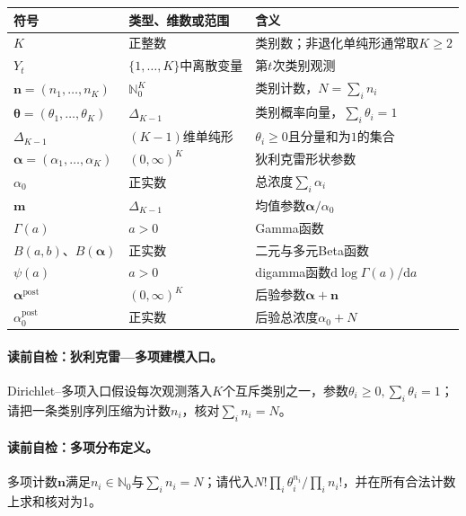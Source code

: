 \begin{symboltablebox}
\small
\begin{tabularx}{\linewidth}{@{}l l X@{}}
\toprule 符号 & 类型、维数或范围 & 含义\\ \midrule
$K$ & 正整数 & 类别数；非退化单纯形通常取$K\ge2$\\
$Y_t$ & $\{1,\ldots,K\}$中离散变量 & 第$t$次类别观测\\
$\boldsymbol n=(n_1,\ldots,n_K)$ & $\mathbb N_0^K$ & 类别计数，$N=\sum_i n_i$\\
$\boldsymbol\theta=(\theta_1,\ldots,\theta_K)$ & $\Delta_{K-1}$ & 类别概率向量，$\sum_i\theta_i=1$\\
$\Delta_{K-1}$ & $(K-1)$维单纯形 & $\theta_i\ge0$且分量和为$1$的集合\\
$\boldsymbol\alpha=(\alpha_1,\ldots,\alpha_K)$ & $(0,\infty)^K$ & 狄利克雷形状参数\\
$\alpha_0$ & 正实数 & 总浓度$\sum_i\alpha_i$\\
$\boldsymbol m$ & $\Delta_{K-1}$ & 均值参数$\boldsymbol\alpha/\alpha_0$\\
$\Gamma(a)$ & $a>0$ & Gamma函数\\
$B(a,b)$、$B(\boldsymbol\alpha)$ & 正实数 & 二元与多元Beta函数\\
$\psi(a)$ & $a>0$ & digamma函数$\mathrm d\log\Gamma(a)/\mathrm da$\\
$\boldsymbol\alpha^{\mathrm{post}}$ & $(0,\infty)^K$ & 后验参数$\boldsymbol\alpha+\boldsymbol n$\\
$\alpha_0^{\mathrm{post}}$ & 正实数 & 后验总浓度$\alpha_0+N$\\
\bottomrule
\end{tabularx}
\end{symboltablebox}

\paragraph{读前自检：狄利克雷—多项建模入口。}Dirichlet--多项入口假设每次观测落入$K$个互斥类别之一，参数$\theta_i\ge0,\sum_i\theta_i=1$；请把一条类别序列压缩为计数$n_i$，核对$\sum_i n_i=N$。\par
\paragraph{读前自检：多项分布定义。}多项计数$\boldsymbol n$满足$n_i\in\mathbb N_0$与$\sum_i n_i=N$；请代入$N!\prod_i\theta_i^{n_i}/\prod_i n_i!$，并在所有合法计数上求和核对为1。\par

